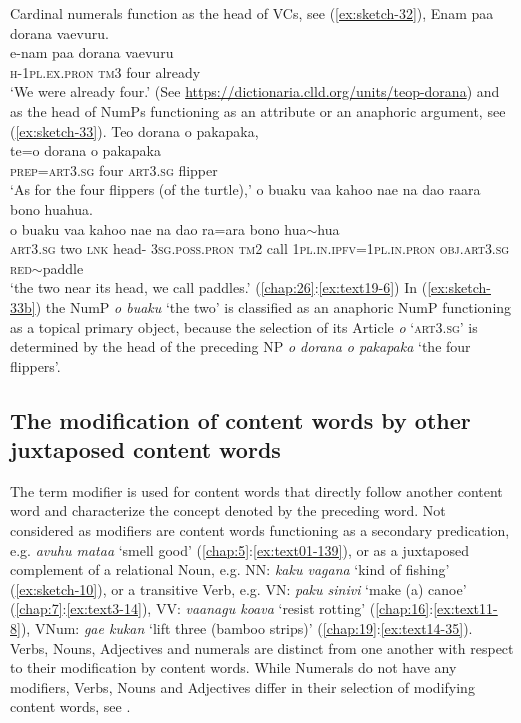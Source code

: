 \documentclass[output=paper]{langscibook}
\begin{document}
Cardinal numerals function as the head of VCs, see (\ref{ex:sketch-32}),
\ea\label{ex:sketch-32}
    Enam paa dorana vaevuru.\\
    \gll e-nam paa dorana vaevuru\\
    \textsc{h}-1\textsc{pl}.\textsc{ex}.\textsc{pron} \textsc{tm}3 four already\\
    \glt `We were already four.' (See \url{https://dictionaria.clld.org/units/teop-dorana})
\z
and as the head of NumPs functioning as an attribute or an anaphoric argument, see (\ref{ex:sketch-33}).
\ea\label{ex:sketch-33}
\ea\label{ex:sketch-33a}
    Teo dorana o pakapaka,\\
    \gll te=o dorana o pakapaka\\
    \textsc{prep}=\textsc{art}3.\textsc{sg} four \textsc{art}3.\textsc{sg}	flipper\\
    \glt `As for the four flippers (of the turtle),'
\ex\label{ex:sketch-33b}
    o buaku vaa kahoo nae na dao raara bono huahua.\\
    \gll o buaku vaa kahoo nae na dao ra=ara bono hua{$\sim$}hua\\
    \textsc{art}3.\textsc{sg} two \textsc{lnk} head-	3\textsc{sg}.\textsc{poss}.\textsc{pron} \textsc{tm}2 call 1\textsc{pl}.\textsc{in}.\textsc{ipfv}=1\textsc{pl}.\textsc{in}.\textsc{pron} \textsc{obj}.\textsc{art}3.\textsc{sg} \textsc{red}{$\sim$}paddle\\
    \glt `the two near its head, we call paddles.' (\ref{chap:26}:\ref{ex:text19-6})
\z
\z
In (\ref{ex:sketch-33b}) the NumP \textit{o buaku} `the two' is classified as an anaphoric NumP functioning as a topical primary object, because the selection of its Article \textit{o} `\textsc{art}3.\textsc{sg}' is determined by the head of the preceding NP \textit{o dorana o pakapaka} `the four flippers'.
\subsection{The modification of content words by other juxtaposed content words}\label{sec:modjux}
The term modifier is used for content words that directly follow another content word and characterize the concept denoted by the preceding word. Not considered as modifiers are content words functioning as a secondary predication, e.g. \textit{avuhu mataa} `smell good' (\ref{chap:5}:\ref{ex:text01-139}), or as a juxtaposed complement of a relational Noun, e.g. NN: \textit{kaku vagana} `kind of fishing' (\ref{ex:sketch-10}), or a transitive Verb, e.g. VN: \textit{paku sinivi} `make (a) canoe' (\ref{chap:7}:\ref{ex:text3-14}), VV: \textit{vaanagu koava} `resist rotting' (\ref{chap:16}:\ref{ex:text11-8}), VNum: \textit{gae kukan} `lift three (bamboo strips)' (\ref{chap:19}:\ref{ex:text14-35}).
Verbs, Nouns, Adjectives and numerals are distinct from one another with respect to their modification by content words. While Numerals do not have any modifiers, Verbs, Nouns and Adjectives differ in their selection of modifying content words, see .
\end{document}
